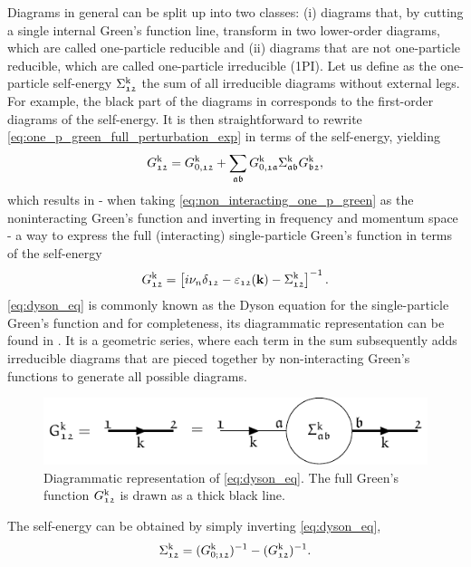 \documentclass[../../main.tex]{subfiles}
\begin{document}
Diagrams in general can be split up into two classes: (i) diagrams that, by cutting a single internal Green's function line, transform in two lower-order diagrams, which are called one-particle reducible and (ii) diagrams that are not one-particle reducible, which are called one-particle irreducible (1PI). Let us define as the one-particle self-energy $\Sigma_{\mathfrak{12}}^{\text{k}}$ the sum of all irreducible diagrams without external legs. For example, the black part of the diagrams in  corresponds to the first-order diagrams of the self-energy. It is then straightforward to rewrite \eqref{eq:one_p_green_full_perturbation_exp} in terms of the self-energy, yielding
\begin{align}\label{eq:dyson_eq}
	G_{\mathfrak{12}}^{\text{k}}=G_{0,\mathfrak{12}}^{\text{k}}+\sum_{\mathfrak{ab}}G_{0,\mathfrak{1a}}^{\text{k}}\Sigma_{\mathfrak{ab}}^{\text{k}}G_{\mathfrak{b2}}^{\text{k}},
\end{align}
which results in - when taking \eqref{eq:non_interacting_one_p_green} as the noninteracting Green's function and inverting in frequency and momentum space - a way to express the full (interacting) single-particle Green's function in terms of the self-energy
\begin{align}
	G_{\mathfrak{12}}^{\text{k}} = \left [i\nu_n\delta_{\mathfrak{12}}-\varepsilon_{\mathfrak{12}}(\textbf{k})-\Sigma_{\mathfrak{12}}^{\text{k}}\right ]^{-1}.
\end{align}
\eqref{eq:dyson_eq} is commonly known as the Dyson equation for the single-particle Green's function and for completeness, its diagrammatic representation can be found in . It is a geometric series, where each term in the sum subsequently adds irreducible diagrams that are pieced together by non-interacting Green's functions to generate all possible diagrams.
\begin{figure}[ht!]
	\centering
	\includegraphics[scale=1.2]{Graphics/Diagrams/dyson_eq/dyson_eq}
	\caption{Diagrammatic representation of \eqref{eq:dyson_eq}. The full Green's function $G_{\mathfrak{12}}^{\text{k}}$ is drawn as a thick black line.}
	\label{fig:dyson_eq}
\end{figure}
The self-energy can be obtained by simply inverting \eqref{eq:dyson_eq},
\begin{align}
	\Sigma_{\mathfrak{12}}^{\text{k}}=(G_{0;\mathfrak{12}}^{\text{k}})^{-1}-(G_{\mathfrak{12}}^{\text{k}})^{-1}.
\end{align}
\end{document}

